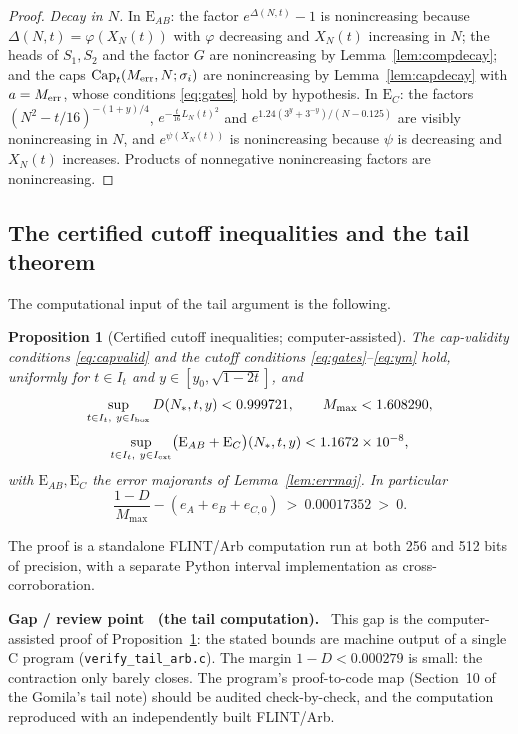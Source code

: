 \documentclass[11pt]{article}
\newtheorem{proposition}[theorem]{Proposition}
\theoremstyle{definition}
\newcounter{gapctr}
\newenvironment{gap}[1]{%
  \refstepcounter{gapctr}%
  \def\FrameCommand{\fboxsep=8pt\fcolorbox{gapred}{gapbg}}%
  \begin{framed}\noindent\textbf{\color{gapred}Gap / review point \thegapctr\ (#1).}\ }%
  {\end{framed}}
\newcommand{\CapT}{\operatorname{Cap}}
\begin{document}
\begin{proof}
\emph{Decay in $N$.} In $\mathrm{E}_{AB}$: the factor
$e^{\Delta(N,t)}-1$ is nonincreasing because
$\Delta(N,t)=\varphi(X_N(t))$ with $\varphi$ decreasing and
$X_N(t)$ increasing in $N$; the heads of $S_1,S_2$ and the factor
$G$ are nonincreasing by Lemma~\ref{lem:compdecay}; and the caps
$\CapT_t(M_{\rm err},N;\sigma_i)$ are nonincreasing by
Lemma~\ref{lem:capdecay} with $a=M_{\rm err}$, whose conditions
\eqref{eq:gates} hold by hypothesis. In $\mathrm{E}_{C}$: the
factors $(N^2-t/16)^{-(1+y)/4}$, $e^{-\frac t{16}L_N(t)^2}$ and
$e^{1.24(3^y+3^{-y})/(N-0.125)}$ are visibly nonincreasing in $N$,
and $e^{\psi(X_N(t))}$ is nonincreasing because $\psi$ is
decreasing and $X_N(t)$ increases. Products of nonnegative
nonincreasing factors are nonincreasing.
\end{proof}

\subsection{The certified cutoff inequalities and the tail theorem}
\label{sec:tailcert}

The computational input of the tail argument is the following.

\begin{proposition}[Certified cutoff inequalities; computer-assisted]
\label{prop:tailcert}
The cap-validity conditions \eqref{eq:capvalid} and the cutoff
conditions \eqref{eq:gates}--\eqref{eq:ym} hold, uniformly for
$t\in I_t$ and $y\in[y_0,\sqrt{1-2t}]$, and
\[
\sup_{t\in I_t,\ y\in I_{\rm box}}D(N_*,t,y)<0.999721,
\qquad
M_{\max}<1.608290,
\]
\[
\sup_{t\in I_t,\ y\in I_{\rm ext}}
\bigl(\mathrm{E}_{AB}+\mathrm{E}_{C}\bigr)(N_*,t,y)
<1.1672\times10^{-8},
\]
with $\mathrm{E}_{AB},\mathrm{E}_{C}$ the error majorants of
Lemma~\ref{lem:errmaj}. In particular
\[
\frac{1-D}{M_{\max}}-(e_A+e_B+e_{C,0})\ >\ 0.00017352\ >\ 0 .
\]
\end{proposition}

The proof is a standalone FLINT/Arb computation run at
both 256 and 512 bits of precision, with a separate Python interval
implementation as cross-corroboration.

\begin{gap}{the tail computation}\label{gap:tailcomp}
This gap is the computer-assisted proof of
Proposition~\ref{prop:tailcert}: the stated bounds are machine
output of a single C program (\texttt{verify\_tail\_arb.c}). The
margin $1-D<0.000279$ is small: the contraction only barely closes.
The program's proof-to-code map (Section~10 of the Gomila's tail
note) should be audited check-by-check, and the computation
reproduced with an independently built FLINT/Arb.
\end{gap}
\end{document}
